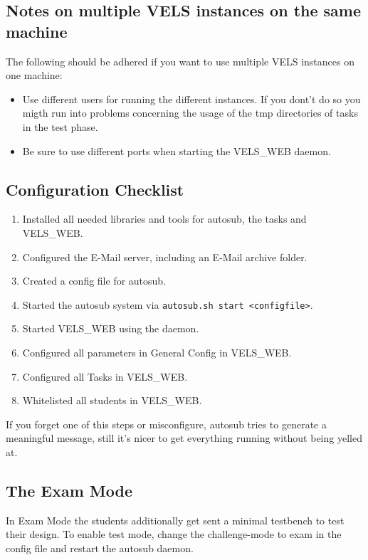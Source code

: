 \subsection{Notes on multiple VELS instances on the same machine}

The following should be adhered if you want to use multiple VELS instances on
one machine:
\begin{itemize}
\item Use different users for running the different instances. If you dont't do
	so you migth run into problems concerning the usage of the tmp directories of
	tasks in the test phase.
\item Be sure to use different ports when starting the VELS\_WEB daemon.
\end{itemize}

\subsection{Configuration Checklist} \label{sub:configChecklist}

\begin{enumerate}
\item Installed all needed libraries and tools for autosub, the tasks and VELS\_WEB.
\item Configured the E-Mail server, including an E-Mail archive folder.
\item Created a config file for autosub.
\item Started the autosub system via {\tt autosub.sh start <configfile>}.
\item Started VELS\_WEB using the daemon.
\item Configured all parameters in General Config in VELS\_WEB.
\item Configured all Tasks in VELS\_WEB.
\item Whitelisted all students in VELS\_WEB.
\end{enumerate}

If you forget one of this steps or misconfigure, autosub tries to generate a meaningful
message, still it's nicer to get everything running without being yelled at.

\subsection{The Exam Mode}\label{sub:exammode}
In Exam Mode the students additionally get sent a minimal testbench to test their design.
To enable test mode, change the challenge-mode to exam in the config file and restart 
the autosub daemon.

